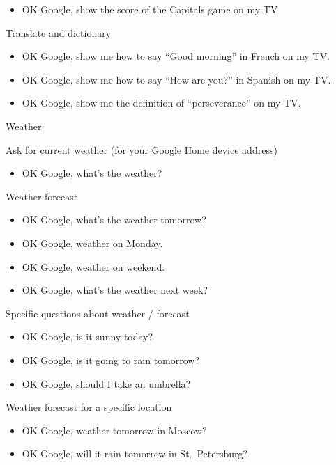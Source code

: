 \documentclass[
  a4paper,
]{article}
\providecommand{\tightlist}{%
  \setlength{\itemsep}{0pt}\setlength{\parskip}{0pt}}\usepackage{longtable,booktabs,array}
\begin{document}
\begin{itemize}
\tightlist
\item
  OK Google, show the score of the Capitals game on my TV
\end{itemize}

Translate and dictionary

\begin{itemize}
\item
  OK Google, show me how to say ``Good morning'' in French on my TV.
\item
  OK Google, show me how to say ``How are you?'' in Spanish on my TV.
\item
  OK Google, show me the definition of ``perseverance'' on my TV.
\end{itemize}

Weather

Ask for current weather (for your Google Home device address)

\begin{itemize}
\tightlist
\item
  OK Google, what's the weather?
\end{itemize}

Weather forecast

\begin{itemize}
\item
  OK Google, what's the weather tomorrow?
\item
  OK Google, weather on Monday.
\item
  OK Google, weather on weekend.
\item
  OK Google, what's the weather next week?
\end{itemize}

Specific questions about weather / forecast

\begin{itemize}
\item
  OK Google, is it sunny today?
\item
  OK Google, is it going to rain tomorrow?
\item
  OK Google, should I take an umbrella?
\end{itemize}

Weather forecast for a specific location

\begin{itemize}
\item
  OK Google, weather tomorrow in Moscow?
\item
  OK Google, will it rain tomorrow in St.~Petersburg?
\end{itemize}


\printbibliography
\end{document}
